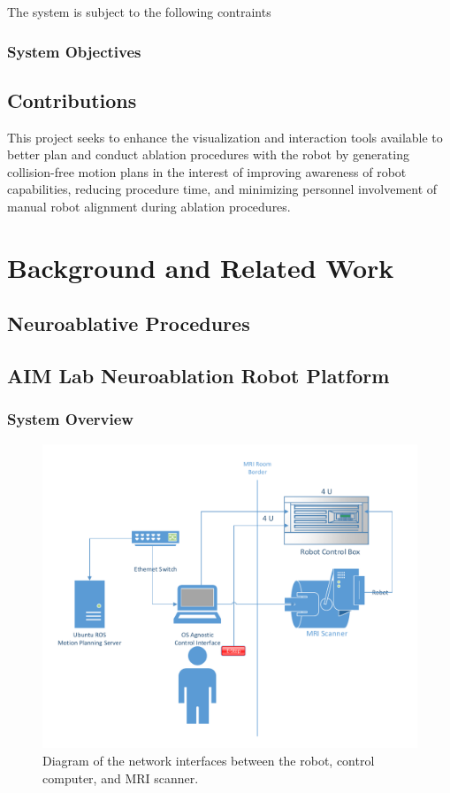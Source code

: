 \documentclass[12pt]{report}
\begin{document}
The system is subject to the following contraints

\subsection{System Objectives}

\section{Contributions}
This project seeks to enhance the visualization and interaction tools available to better plan and conduct ablation procedures with the robot by generating collision-free motion plans in the interest of improving awareness of robot capabilities, reducing procedure time, and minimizing personnel involvement of manual robot alignment during ablation procedures.

\chapter{Background and Related Work}
\section{Neuroablative Procedures}

\section{AIM Lab Neuroablation Robot Platform}

\subsection{System Overview}

\begin{figure}[thpb]
	\centering
	\includegraphics[width=\textwidth]{diagrams/Networking_Diagram.pdf}
    \caption{Diagram of the network interfaces between the robot, control computer, and MRI scanner. }
    \label{fig:networkDiagram}
\end{figure}
\end{document}

